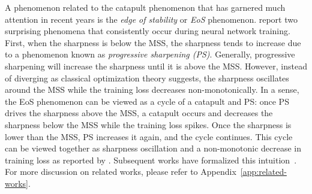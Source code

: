 A phenomenon related to the catapult phenomenon that has garnered much attention in recent years is the \emph{edge of stability} or \emph{EoS} phenomenon. \citet{cohen2021stability} report two surprising phenomena that consistently occur during neural network training. First, when the sharpness is below the MSS, the sharpness tends to increase due to a phenomenon known as \emph{progressive sharpening (PS)}. Generally, progressive sharpening will increase the sharpness until it is above the MSS. However, instead of diverging as classical optimization theory suggests, the sharpness oscillates around the MSS while the training loss decreases non-monotonically. In a sense, the EoS phenomenon can be viewed as a cycle of a catapult and PS: once PS drives the sharpness above the MSS, a catapult occurs and decreases the sharpness below the MSS while the training loss spikes. Once the sharpness is lower than the MSS, PS increases it again, and the cycle continues. This cycle can be viewed together as sharpness oscillation and a non-monotonic decrease in training loss as reported by \citet{cohen2021stability}.
Subsequent works have formalized this intuition~\citep{damian2023stabilization,agarwala2023eos}. For more discussion on related works, please refer to Appendix~\ref{app:related-works}.

